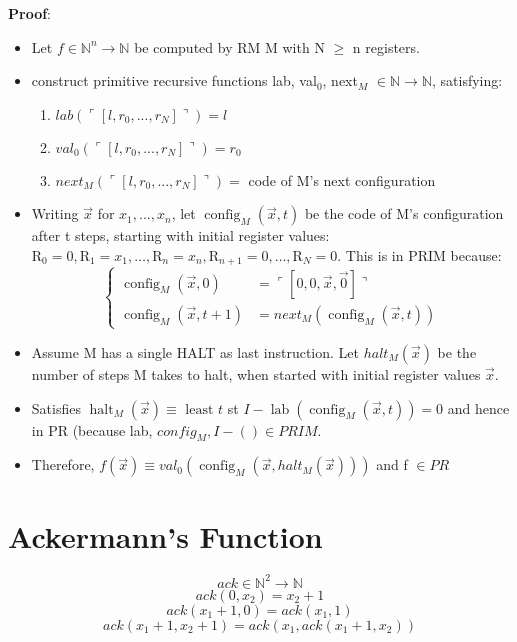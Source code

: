 \documentclass{article}
\begin{document}
\noindent
\textbf{Proof}:
\begin{itemize}
    \item Let $f \in \mathbb{N}^{n} \rightarrow \mathbb{N}$ be computed by RM M with N $\geq$ n registers.
    \item construct primitive recursive functions lab, val$_{0}$, next$_{M}$ $\in \mathbb{N} \rightarrow \mathbb{N}$, satisfying:
    \begin{enumerate}
        \item $lab(\ulcorner[l, r_{0}, ..., r_{N}]\urcorner)=l$
        \item $val_{0}(\ulcorner[l, r_{0}, ..., r_{N}]\urcorner)=r_{0}$
        \item $next_{M}(\ulcorner[l, r_{0}, ..., r_{N}]\urcorner)=$ code of M's next configuration
    \end{enumerate}
    
    \item Writing $\vec{x}$ for $x_{1}, ..., x_{n}$, let $\operatorname{config}_{M}(\vec{x}, t)$ be the code of M's configuration after t steps, starting with initial register values: $\mathrm{R}_{0}=0, \mathrm{R}_{1}=x_{1}, \ldots, \mathrm{R}_{n}=x_{n}, \mathrm{R}_{n+1}=0, \dots, \mathrm{R}_{N}=0$. This is in PRIM because:
    $$ \left\{\begin{array}{ll}{\operatorname{config}_{M}(\vec{x}, 0)} & {=\ulcorner[0,0, \vec{x}, \vec{0}]\urcorner} \\ {\operatorname{config}_{M}(\vec{x}, t+1)} & {=n e x t_{M}\left(\operatorname{config}_{M}(\vec{x}, t)\right)}\end{array}\right.$$
    
    \item Assume M has a single HALT as last instruction. Let $h a l t_{M}(\vec{x})$ be the number of steps M takes to halt, when started with initial register values $\vec{x}$. 
    
    \item Satisfies $\operatorname{halt}_{M}(\vec{x}) \equiv \text { least } t$ st $I-\operatorname{lab}\left(\operatorname{config}_{M}(\vec{x}, t)\right)=0$ and hence in PR (because lab, $config_{M}, I - () \in PRIM$.
    
    \item Therefore, $f(\vec{x}) \equiv v a l_{0}\left(\operatorname{config} _{M}\left(\vec{x}, h a l t_{M}(\vec{x})\right)\right)$ and f $\in PR$
\end{itemize}

\section{Ackermann's Function}
\textbf{$$ack \in \mathbb{N}^{2} \rightarrow \mathbb{N}$$}
$$ack(0, x_{2}) = x_{2}+1$$
$$ack(x_{1}+1, 0) = ack(x_{1}, 1)$$
$$ack(x_{1} + 1, x_{2}+1)=ack(x_{1}, ack(x_{1}+1, x_{2}))$$
\end{document}
